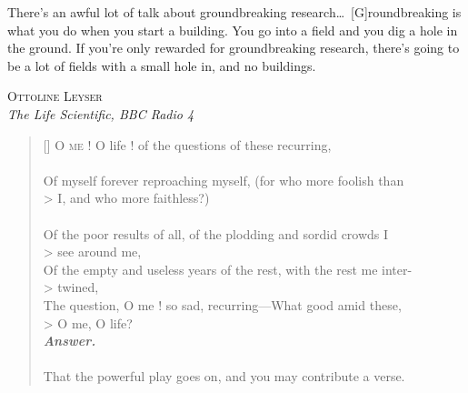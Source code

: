 \documentclass[11pt,english,]{memoir}
\begin{document}
\clearpage
\begin{vplace} %

\setlength{}
\epigraph{There's an awful lot of talk about groundbreaking research\ldots\ [G]roundbreaking is what you do when you start a building. You go into a field and you dig a hole in the ground. If you're only rewarded for groundbreaking research, there's going to be a lot of fields with a small hole in, and no buildings.}{\textsc{Ottoline Leyser}\\ \textit{The Life Scientific, BBC Radio 4}}

\vspace{2\baselineskip}

\settowidth{\versewidth}{Of myself forever reproaching myself, (for who more foolish than)} %
\begin{verse}[\versewidth]
O \textsc{me} ! O life ! of the questions of these recurring, \\
\dotrule{\versewidth} \\
Of myself forever reproaching myself, (for who more foolish than \\> I, and who more faithless?) \\
\dotrule{\versewidth} \\
Of the poor results of all, of the plodding and sordid crowds I \\> see around me, \\
Of the empty and useless years of the rest, with the rest me inter- \\> twined, \\
The question, O me ! so sad, recurring---What good amid these, \\> O me, O life? \\
 \textbf{\textit{\footnotesize Answer.}} \\
\dotrule{\versewidth} \\
That the powerful play goes on, and you may contribute a verse.\\
\end{verse}

\end{vplace}

\cleardoublepage
\pagestyle{plain}

{
\hypersetup{linkcolor=black} %
\tableofcontents* %
}
\end{document}
